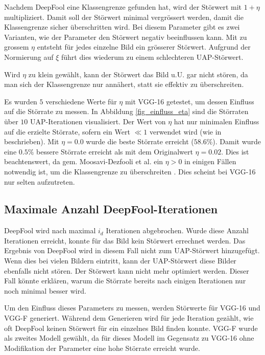 \documentclass{FFHS_Thesis_Additions/ffhsthesis}
\begin{document}
Nachdem DeepFool eine Klassengrenze gefunden hat, wird der Störwert mit $1+\eta$ multipliziert. 
Damit soll der Störwert minimal vergrössert werden, damit die Klassengrenze sicher überschritten wird. 
Bei diesem Parameter gibt es zwei Varianten, wie der Parameter den Störwert negativ beeinflussen kann. 
Mit zu grossem $\eta$ entsteht für jedes einzelne Bild ein grösserer Störwert. 
Aufgrund der Normierung auf $\xi$ führt dies wiederum zu einem schlechteren UAP-Störwert.

Wird $\eta$ zu klein gewählt, kann der Störwert das Bild u.U. gar nicht stören, da man sich der Klassengrenze nur annähert, statt sie effektiv zu überschreiten.

Es wurden $5$ verschiedene Werte für $\eta$ mit VGG-16 getestet, um dessen Einfluss auf die Störrate zu messen. 
In Abbildung \ref{fig_einfluss_eta} sind die Störraten über $10$ UAP-Iterationen visualisiert. 
Der Wert von $\eta$ hat nur minimalen Einfluss auf die erzielte Störrate, sofern ein Wert $\ll 1$ verwendet wird (wie in \cite{moosavi-dezfooli_deepfool_2016} beschrieben). 
Mit $\eta=0.0$ wurde die beste Störrate erreicht ($58.6\%$). 
Damit wurde eine $0.5\%$ bessere Störrate erreicht als mit dem Originalwert $\eta=0.02$. 
Dies ist beachtenswert, da gem. Moosavi-Dezfooli et al. ein $\eta > 0$ in einigen Fällen notwendig ist, um die Klassengrenze zu überschreiten \cite{moosavi-dezfooli_deepfool_2016}. Dies scheint bei VGG-16 nur selten aufzutreten.


\subsection{Maximale Anzahl DeepFool-Iterationen}

DeepFool wird nach maximal $i_d$ Iterationen abgebrochen. 
Wurde diese Anzahl Iterationen erreicht, konnte für das Bild kein Störwert errechnet werden. 
Das Ergebnis von DeepFool wird in diesem Fall nicht zum UAP-Störwert hinzugefügt. 
Wenn dies bei vielen Bildern eintritt, kann der UAP-Störwert diese Bilder ebenfalls nicht stören. Der Störwert kann nicht mehr optimiert werden. Dieser Fall könnte erklären, warum die Störrate bereits nach einigen Iterationen nur noch minimal besser wird. 

Um den Einfluss dieses Parameters zu messen, werden Störwerte für VGG-16 und VGG-F generiert. Während dem Generieren wird für jede Iteration gezählt, wie oft DeepFool keinen Störwert für ein einzelnes Bild finden konnte. VGG-F wurde als zweites Modell gewählt, da für dieses Modell im Gegensatz zu VGG-16 ohne Modifikation der Parameter eine hohe Störrate erreicht wurde.
\end{document}
